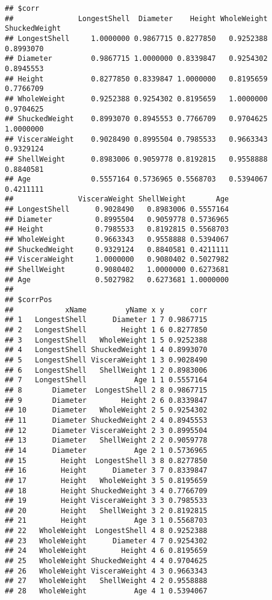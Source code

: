 \documentclass[
]{article}
\begin{document}
\begin{verbatim}
## $corr
##               LongestShell  Diameter    Height WholeWeight ShuckedWeight
## LongestShell     1.0000000 0.9867715 0.8277850   0.9252388     0.8993070
## Diameter         0.9867715 1.0000000 0.8339847   0.9254302     0.8945553
## Height           0.8277850 0.8339847 1.0000000   0.8195659     0.7766709
## WholeWeight      0.9252388 0.9254302 0.8195659   1.0000000     0.9704625
## ShuckedWeight    0.8993070 0.8945553 0.7766709   0.9704625     1.0000000
## VisceraWeight    0.9028490 0.8995504 0.7985533   0.9663343     0.9329124
## ShellWeight      0.8983006 0.9059778 0.8192815   0.9558888     0.8840581
## Age              0.5557164 0.5736965 0.5568703   0.5394067     0.4211111
##               VisceraWeight ShellWeight       Age
## LongestShell      0.9028490   0.8983006 0.5557164
## Diameter          0.8995504   0.9059778 0.5736965
## Height            0.7985533   0.8192815 0.5568703
## WholeWeight       0.9663343   0.9558888 0.5394067
## ShuckedWeight     0.9329124   0.8840581 0.4211111
## VisceraWeight     1.0000000   0.9080402 0.5027982
## ShellWeight       0.9080402   1.0000000 0.6273681
## Age               0.5027982   0.6273681 1.0000000
## 
## $corrPos
##            xName         yName x y      corr
## 1   LongestShell      Diameter 1 7 0.9867715
## 2   LongestShell        Height 1 6 0.8277850
## 3   LongestShell   WholeWeight 1 5 0.9252388
## 4   LongestShell ShuckedWeight 1 4 0.8993070
## 5   LongestShell VisceraWeight 1 3 0.9028490
## 6   LongestShell   ShellWeight 1 2 0.8983006
## 7   LongestShell           Age 1 1 0.5557164
## 8       Diameter  LongestShell 2 8 0.9867715
## 9       Diameter        Height 2 6 0.8339847
## 10      Diameter   WholeWeight 2 5 0.9254302
## 11      Diameter ShuckedWeight 2 4 0.8945553
## 12      Diameter VisceraWeight 2 3 0.8995504
## 13      Diameter   ShellWeight 2 2 0.9059778
## 14      Diameter           Age 2 1 0.5736965
## 15        Height  LongestShell 3 8 0.8277850
## 16        Height      Diameter 3 7 0.8339847
## 17        Height   WholeWeight 3 5 0.8195659
## 18        Height ShuckedWeight 3 4 0.7766709
## 19        Height VisceraWeight 3 3 0.7985533
## 20        Height   ShellWeight 3 2 0.8192815
## 21        Height           Age 3 1 0.5568703
## 22   WholeWeight  LongestShell 4 8 0.9252388
## 23   WholeWeight      Diameter 4 7 0.9254302
## 24   WholeWeight        Height 4 6 0.8195659
## 25   WholeWeight ShuckedWeight 4 4 0.9704625
## 26   WholeWeight VisceraWeight 4 3 0.9663343
## 27   WholeWeight   ShellWeight 4 2 0.9558888
## 28   WholeWeight           Age 4 1 0.5394067

\end{verbatim}
\end{document}
